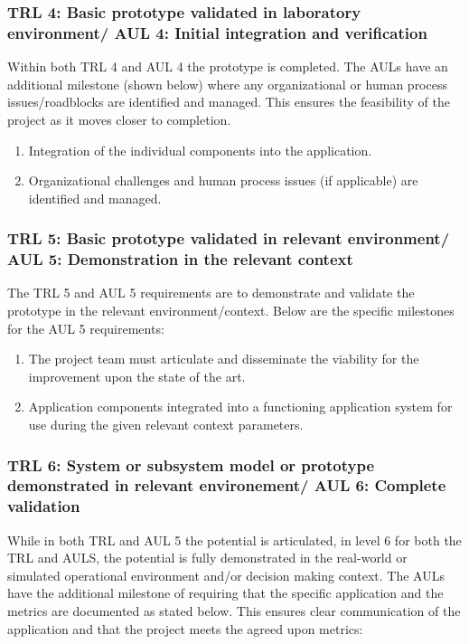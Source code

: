\documentclass[referee,a4paper,12pt,traditabstract]{swsc}
\begin{document}
\begin{linenumbers}
\subsubsection{TRL 4: Basic prototype validated in laboratory environment/ AUL 4: Initial integration and verification}
Within both TRL 4 and AUL 4 the prototype is completed. The AULs have an additional milestone (shown below) where any organizational or human process issues/roadblocks are identified and managed. This ensures the feasibility of the project as it moves closer to completion. \\

\begin{enumerate}
\item Integration of the individual components into the application.
\item Organizational challenges and human process issues (if applicable) are identified and managed. 
\end{enumerate}

\subsubsection{TRL 5: Basic prototype validated in relevant environment/ AUL 5: Demonstration in the relevant context}
The TRL 5 and AUL 5 requirements are to demonstrate and validate the prototype in the relevant environment/context. Below are the specific milestones for the AUL 5 requirements:\\

\begin{enumerate}
\item The project team must articulate and disseminate the viability  for the improvement upon the state of the art.
\item Application components integrated into a functioning application system for use during the given relevant context parameters. 
\end{enumerate}

\subsubsection{TRL 6: System or subsystem model or prototype demonstrated in relevant environement/ AUL 6: Complete validation}
While in both TRL and AUL 5 the potential is articulated, in level 6 for both the TRL and AULS, the potential is fully demonstrated in the real-world or simulated operational environment and/or decision making context. The AULs have the additional milestone of requiring that the specific application and the metrics are documented as stated below. This ensures clear communication of the application and that the project meets the agreed upon metrics:\\


\end{linenumbers}
\end{document}
